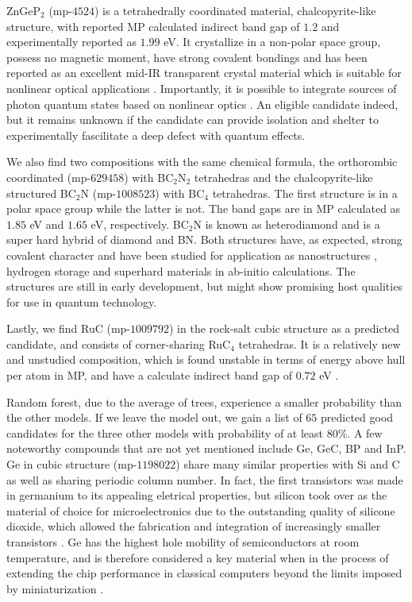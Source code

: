 ZnGeP$_2$ (mp-$4524$) is a tetrahedrally coordinated material, chalcopyrite-like structure, with reported MP calculated indirect band gap of $1.2$ \cite{Zhang2015} and experimentally reported as $1.99$ eV\cite{Xing1989}. It crystallize in a non-polar space group, possess no magnetic moment, have strong covalent bondings and has been reported as an excellent mid-IR transparent crystal material which is suitable for nonlinear optical applications \cite{Zhang2015}. Importantly, it is possible to integrate sources of photon quantum states based on nonlinear optics \cite{Caspani2017}. An eligible candidate indeed, but it remains unknown if the candidate can provide isolation and shelter to experimentally fascilitate a deep defect with quantum effects.

We also find two compositions with the same chemical formula, the orthorombic coordinated (mp-$629458$) with BC$_2$N$_2$ tetrahedras and the chalcopyrite-like structured BC$_2$N (mp-$1008523$) with BC$_4$ tetrahedras. The first structure is in a polar space group while the latter is not. The band gaps are in MP calculated as $1.85$ eV and $1.65$ eV, respectively. BC$_2$N is known as heterodiamond and is a super hard hybrid of diamond and BN. Both structures have, as expected, strong covalent character and have been studied for application as nanostructures \cite{Gao2017}, hydrogen storage \cite{Cai2017} and superhard materials \cite{Li2017, Jiang2020} in ab-initio calculations. The structures are still in early development, but might show promising host qualities for use in quantum technology.

Lastly, we find RuC (mp-$1009792$) in the rock-salt cubic structure as a predicted candidate, and consists of corner-sharing RuC$_4$ tetrahedras. It is a relatively new and unstudied composition, which is found unstable in terms of energy above hull per atom in MP, and have a calculate indirect band gap of $0.72$ eV \cite{RuC2020}.

Random forest, due to the average of trees, experience a smaller probability than the other models. If we leave the model out, we gain a list of $65$ predicted good candidates for the three other models with probability of at least $80\%$. A few noteworthy compounds that are not yet mentioned include Ge, GeC, BP and InP. Ge in cubic structure (mp-$1198022$) share many similar properties with Si and C as well as sharing periodic column number. In fact, the first transistors was made in germanium to its appealing eletrical properties, but silicon took over as the material of choice for microelectronics due to the outstanding quality of silicone dioxide, which allowed the fabrication and integration of increasingly smaller transistors \cite{Scappucci2020, Pillarisetty2011}. Ge has the highest hole mobility of semiconductors at room temperature, and is therefore considered a key material when in the process of extending the chip performance in classical computers beyond the limits imposed by miniaturization \cite{Scappucci2020}.

